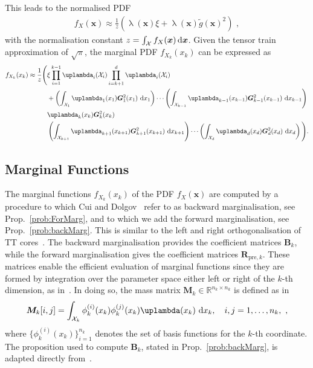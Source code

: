 This leads to the normalised PDF \cite[Eq.~19]{cui2022deep}
\begin{align}
	f_X(\bm{x})  \approx \frac{1}{z} \left( \uplambda(\bm{x}) \xi  + \uplambda(\bm{x}) \tilde{g}(\bm{x})^2 \right)\, \, ,
\end{align}
with the normalisation constant $z = \int_{\mathcal{X}} f_X(\bm{x}) \mathop{}\!\mathrm{d} \bm{x} $.
Given the tensor train approximation of $\sqrt{\pi}$, the marginal PDF $f_{X_k}(x_k)$ can be expressed as
\begin{align}
	\begin{split}
		f_{X_k}(x_k)  \approx \frac{1}{z} \Bigg(&\xi \prod_{i=1}^{k-1} \uplambda_i(\mathcal{X}_i) \prod_{i=k+1}^{d} \uplambda_i(\mathcal{X}_i) \\
		&+ \left( \int_{\mathcal{X}_1} \uplambda_1(x_1) \bm{G}_1^2(x_1)  \, \diff x_1 \right) \cdots 
		\left( \int_{\mathcal{X}_{k-1}} \uplambda_{k-1}(x_{k-1}) \bm{G}_{k-1}^2(x_{k-1}) \, \diff x_{k-1} \right) \\
		& \uplambda_k(x_k) \bm{G}_k^2(x_k)  \\
		&\left( \int_{\mathcal{X}_{k+1}} \uplambda_{k+1}(x_{k+1}) \bm{G}_{k+1}^2(x_{k+1})  \,\diff x_{k+1} \right) \cdots 
		\left( \int_{\mathcal{X}_d} \uplambda_d(x_d) \bm{G}_d^2(x_d)  \, \diff x_d \right) \Bigg).
	\end{split}
\end{align}




\subsection{Marginal Functions}
\label{subsec:TTMarg}
The marginal functions $f_{X_k}(x_k)$ of the PDF $f_{X}(\bm{x})$ are computed by a procedure to which Cui and Dolgov~\cite{cui2022deep} refer to as backward marginalisation, see Prop.~\ref{prob:ForMarg}, and to which we add the forward marginalisation, see Prop.~\ref{prob:backMarg}. 
This is similar to the left and right orthogonalisation of TT cores~\cite{oseledets2011tensor, Oseledets2011DMRG}.
The backward marginalisation provides the coefficient matrices $\bm{B}_k$, while the forward marginalisation gives the coefficient matrices $\bm{R}_{\text{pre}, k}$. 
These matrices enable the efficient evaluation of marginal functions since they are formed by integration over the parameter space either left or right of the $k$-th dimension, as in~\cite{cui2022deep}. 
In doing so, the mass matrix $\bm{M}_k \in \mathbb{R}^{n_k \times n_k}$ is defined as in \cite[Eq.~22]{cui2022deep}
\begin{equation}
	\bm{M}_k[i, j] = \int_{\mathcal{X}_k} \phi^{(i)}_k(x_k) \phi^{(j)}_k(x_k) \uplambda(x_k) \, \diff x_k, \quad i, j = 1, \dots, n_k, \, \,   \label{eq:MassMat},
\end{equation}
where $\{\phi^{(i)}_k(x_k)\}_{i=1}^{n_k}$ denotes the set of basis functions for the $k$-th coordinate.
The proposition used to compute $\bm{B}_k$, stated in Prop.~\ref{prob:backMarg}, is adapted directly from~\cite{cui2022deep}.

